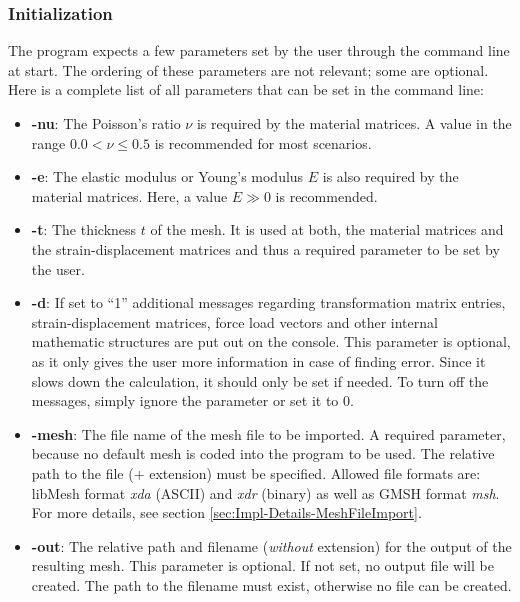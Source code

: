   \subsubsection{Initialization}\label{sec:Impl-Details-Init}
  The program expects a few parameters set by the user through the command line at start. The ordering of these parameters are not relevant; some are optional. Here is a complete list of all parameters that can be set in the command line:
  \begin{itemize}
  	\item \textbf{-nu}: The Poisson's ratio $\nu$ is required by the material matrices. A value in the range $0.0 < \nu \leq 0.5$ is recommended for most scenarios.
  	\item \textbf{-e}: The elastic modulus or Young's modulus $E$ is also required by the material matrices. Here, a value $E \gg 0$ is recommended.
  	\item \textbf{-t}: The thickness $t$ of the mesh. It is used at both, the material matrices and the strain-displacement matrices and thus a required parameter to be set by the user.
  	\item \textbf{-d}: If set to "`1"' additional messages regarding transformation matrix entries, strain-displacement matrices, force load vectors and other internal mathematic structures are put out on the console. This parameter is optional, as it only gives the user more information in case of finding error. Since it slows down the calculation, it should only be set if needed. To turn off the messages, simply ignore the parameter or set it to 0.
  	\item \textbf{-mesh}: The file name of the mesh file to be imported. A required parameter, because no default mesh is coded into the program to be used. The relative path to the file (+ extension) must be specified. Allowed file formats are: libMesh format \textit{xda} (ASCII) and \textit{xdr} (binary) as well as GMSH format \textit{msh}. For more details, see section \ref{sec:Impl-Details-MeshFileImport}.
  	\item \textbf{-out}: The relative path and filename (\textit{without} extension) for the output of the resulting mesh. This parameter is optional. If not set, no output file will be created. The path to the filename must exist, otherwise no file can be created.
  \end{itemize}
  
